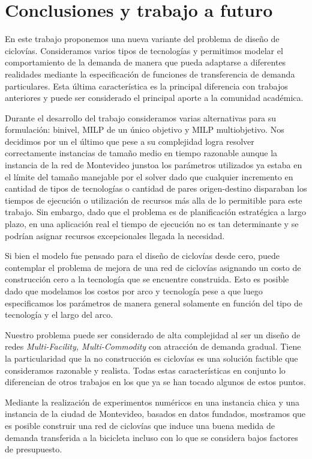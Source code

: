 \chapter{Conclusiones y trabajo a futuro}

En este trabajo proponemos una nueva variante del problema de diseño de ciclovías. Consideramos varios tipos de tecnologías y permitimos modelar el comportamiento de la demanda de manera que pueda adaptarse a diferentes realidades mediante la especificación de funciones de transferencia de demanda particulares. Esta última característica es la principal diferencia con trabajos anteriores y puede ser considerado el principal aporte a la comunidad académica.

Durante el desarrollo del trabajo consideramos varias alternativas para su formulación: binivel, MILP de un único objetivo y MILP multiobjetivo. Nos decidimos por un el último que pese a su complejidad logra resolver correctamente instancias de tamaño medio en tiempo razonable aunque la instancia de la red de Montevideo junstoa los parámetros utilizados ya estaba en el límite del tamaño manejable por el solver dado que cualquier incremento en cantidad de tipos de tecnologías o cantidad de pares origen-destino disparaban los tiempos de ejecución o utilización de recursos más alla de lo permitible para este trabajo. Sin embargo, dado que el problema es de planificación estratégica a largo plazo, en una aplicación real el tiempo de ejecución no es tan determinante y se podrían asignar recursos excepcionales llegada la necesidad.

Si bien el modelo fue pensado para el diseño de ciclovías desde cero, puede contemplar el problema de mejora de una red de ciclovías asignando un costo de construcción cero a la tecnología que se encuentre construida. Esto es posible dado que modelamos los costos por arco y tecnología pese a que luego especificamos los parámetros de manera general solamente en función del tipo de tecnología y el largo del arco.

Nuestro problema puede ser considerado de alta complejidad al ser un diseño de redes {\it Multi-Facility, Multi-Commodity} con atracción de demanda gradual. Tiene la particularidad que la no construcción es ciclovías es una solución factible que consideramos razonable y realista. Todas estas características en conjunto lo diferencian de otros trabajos en los que ya se han tocado algunos de estos puntos.

Mediante la realización de experimentos numéricos en una instancia chica y una instancia de la ciudad de Montevideo, basados en datos fundados, mostramos que es posible construir una red de ciclovías que induce una buena medida de demanda transferida a la bicicleta incluso con lo que se considera bajos factores de presupuesto.


